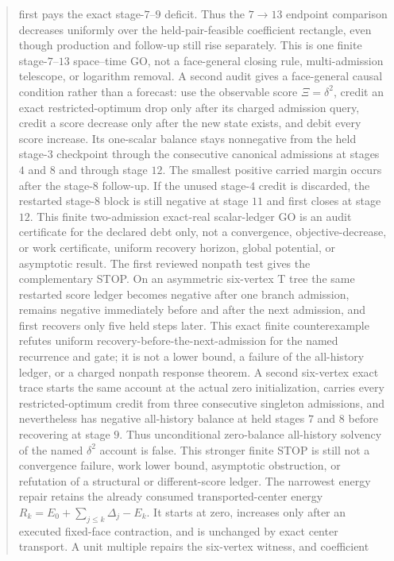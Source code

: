 \documentclass[11pt]{article}
\begin{document}
\begin{abstract}
first pays the exact stage-$7$--$9$ deficit.  Thus the $7\to13$ endpoint
comparison decreases uniformly over the held-pair-feasible coefficient
rectangle, even though production and follow-up still rise separately.  This
is one finite stage-$7$--$13$ space--time GO, not a face-general closing rule,
multi-admission telescope, or logarithm removal.  A second audit gives a
face-general causal condition rather than a forecast: use the observable score
$\Xi=\delta^2$, credit an exact restricted-optimum drop only after its charged
admission query, credit a score decrease only after the new state exists, and
debit every score increase.  Its one-scalar balance stays nonnegative from the
held stage-$3$ checkpoint through the consecutive canonical admissions at
stages $4$ and $8$ and through stage $12$.  The smallest positive carried
margin occurs after the stage-$8$ follow-up.  If the unused stage-$4$ credit is
discarded, the restarted stage-$8$ block is still negative at stage $11$ and
first closes at stage $12$.  This finite two-admission exact-real
scalar-ledger GO is an audit certificate for the declared debt only, not a
convergence, objective-decrease, or work certificate, uniform recovery
horizon, global potential, or asymptotic result.  The first reviewed nonpath
test gives the complementary STOP.  On an asymmetric six-vertex T tree the
same restarted score ledger becomes negative after one branch admission,
remains negative immediately before and after the next admission, and first
recovers only five held steps later.  This exact finite counterexample refutes
uniform recovery-before-the-next-admission for the named recurrence and gate;
it is not a lower bound, a failure of the all-history ledger, or a charged
nonpath response theorem.  A second six-vertex exact trace starts the same
account at the actual zero initialization, carries every restricted-optimum
credit from three consecutive singleton admissions, and nevertheless has
negative all-history balance at held stages $7$ and $8$ before recovering at
stage $9$.  Thus unconditional zero-balance all-history solvency of the named
$\delta^2$ account is false.  This stronger finite STOP is still not a
convergence failure, work lower bound, asymptotic obstruction, or refutation
of a structural or different-score ledger.  The narrowest energy repair
retains the already consumed transported-center energy
$R_k=E_0+\sum_{j\leq k}\Delta_j-E_k$.  It starts at zero, increases only
after an executed fixed-face contraction, and is unchanged by exact center
transport.  A unit multiple repairs the six-vertex witness, and coefficient

\end{abstract}
\end{document}
